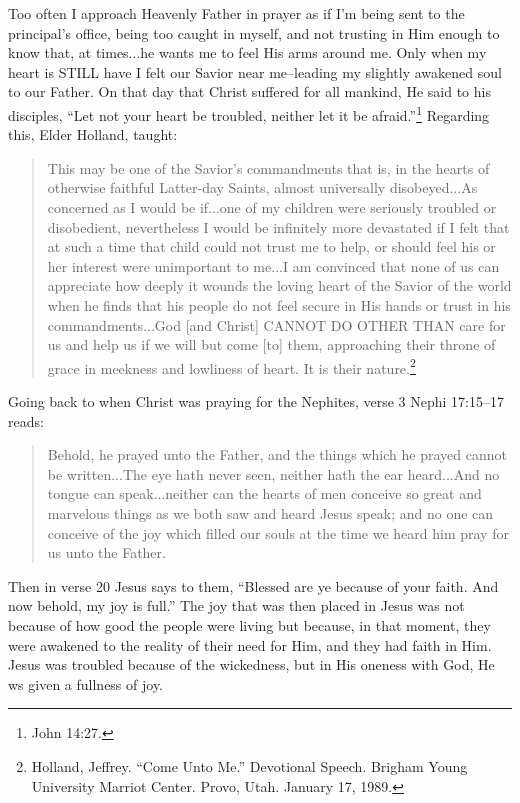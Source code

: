 			Too often I approach Heavenly Father in prayer as if I'm being sent to the principal's office, being too caught in myself, and not trusting in Him enough to know that, at times...he wants me to feel His arms around me. Only when my heart is STILL have I felt our Savior near me--leading my slightly awakened soul to our Father. On that day that Christ suffered for all mankind, He said to his disciples, ``Let not your heart be troubled, neither let it be afraid.''\footnote{John 14:27.} Regarding this, Elder Holland, taught:

			\begin{quotation}
			This may be one of the Savior's commandments that is, in the hearts of otherwise faithful Latter-day Saints, almost universally disobeyed...As concerned as I would be if...one of my children were seriously troubled or disobedient, nevertheless I would be infinitely more devastated if I felt that at such a time that child could not trust me to help, or should feel his or her interest were unimportant to me...I am convinced that none of us can appreciate how deeply it wounds the loving heart of the Savior of the world when he finds that his people do not feel secure in His hands or trust in his commandments...God [and Christ] CANNOT DO OTHER THAN care for us and help us if we will but come [to] them, approaching their throne of grace in meekness and lowliness of heart. It is their nature.\footnote{Holland, Jeffrey. ``Come Unto Me.'' Devotional Speech. Brigham Young University Marriot Center. Provo, Utah. January 17, 1989.}
			\end{quotation}

			Going back to when Christ was praying for the Nephites, verse 3 Nephi 17:15--17 reads:

			\begin{quote}
			Behold, he prayed unto the Father, and the things which he prayed cannot be written...The eye hath never seen, neither hath the ear heard...And no tongue can speak...neither can the hearts of men conceive so great and marvelous things as we both saw and heard Jesus speak; and no one can conceive of the joy which filled our souls at the time we heard him pray for us unto the Father.
			\end{quote}

			Then in verse 20 Jesus says to them, ``Blessed are ye because of your faith. And now behold, my joy is full.'' The joy that was then placed in Jesus was not because of how good the people were living but because, in that moment, they were awakened to the reality of their need for Him, and they had faith in Him. Jesus was troubled because of the wickedness, but in His oneness with God, He ws given a fullness of joy.

